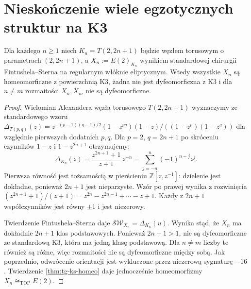 \section{Nieskończenie wiele egzotycznych struktur na K3}
\label{sec:tg-ks-infinite}

\begin{twierdzenie}
\label{thm:tg-ks-infinite}
Dla każdego $n\ge1$ niech $K_n=T(2,2n+1)$ będzie
węzłem torusowym o parametrach $(2,2n+1)$,
a $X_n:=E(2)_{K_n}$ wynikiem standardowej chirurgii
Fintushela--Sterna na regularnym włóknie eliptycznym.
Wtedy wszystkie $X_n$ są homeomorficzne z powierzchnią
K3, żadna nie jest dyfeomorficzna z K3 i dla
$n\ne m$ rozmaitości $X_n,X_m$ nie są dyfeomorficzne.
\end{twierdzenie}

\begin{proof}
Wielomian Alexandera węzła torusowego
$T(2,2n+1)$ wyznaczymy ze standardowego wzoru
$\Delta_{T(p,q)}(z)=z^{-(p-1)(q-1)/2}
(1-z^{pq})(1-z)/((1-z^p)(1-z^q))$
dla względnie pierwszych dodatnich $p,q$.
Dla $p=2$, $q=2n+1$ po skróceniu czynników
$1-z$ i $1-z^{2n+1}$ otrzymujemy:
\[
\Delta_{K_n}(z)
 =\frac{z^{2n+1}+1}{z+1}\,z^{-n}
 =\sum_{j=-n}^{n}(-1)^{n-j}z^j.
\]
Pierwsza równość jest tożsamością w pierścieniu
$\mathbb Z[z,z^{-1}]$: dzielenie jest dokładne,
ponieważ $2n+1$ jest nieparzyste. Wzór po prawej
wynika z rozwinięcia
$(z^{2n+1}+1)/(z+1)
=z^{2n}-z^{2n-1}+\cdots-z+1$.
Każdy z $2n+1$ współczynników jest równy $\pm1$
i jest niezerowy.

Twierdzenie Fintushela--Sterna daje
$\mathcal{SW}_{X_n}=\Delta_{K_n}(u)$.
Wynika stąd, że $X_n$ ma dokładnie $2n+1$
klas podstawowych. Ponieważ $2n+1>1$,
nie są dyfeomorficzne ze standardową K3,
która ma jedną klasę podstawową.
Dla $n\ne m$ liczby te również są różne,
więc rozmaitości nie są dyfeomorficzne między sobą.
Jak poprzednio, odwrócenie orientacji jest
wykluczone przez niezerową sygnaturę $-16$.
Twierdzenie \ref{thm:tg-ks-homeo} daje jednocześnie
homeomorfizmy $X_n\cong_{\mathrm{TOP}}E(2)$.
\end{proof}

